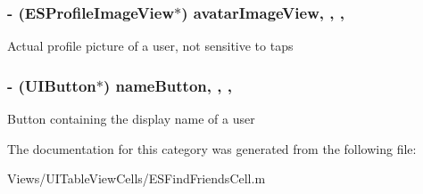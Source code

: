 \subsubsection[{avatar\+Image\+View}]{\setlength{\rightskip}{0pt plus 5cm}-\/ ({\bf E\+S\+Profile\+Image\+View}$\ast$) avatar\+Image\+View\hspace{0.3cm}{\ttfamily [read]}, {\ttfamily [write]}, {\ttfamily [nonatomic]}, {\ttfamily [strong]}}\label{category_e_s_find_friends_cell_07_08_abc768c8e3be189641cb1e8148bb9d060}
Actual profile picture of a user, not sensitive to taps \hypertarget{category_e_s_find_friends_cell_07_08_a620523864206c5b5b2925b7e2409723e}{}
\subsubsection[{name\+Button}]{\setlength{\rightskip}{0pt plus 5cm}-\/ (U\+I\+Button$\ast$) name\+Button\hspace{0.3cm}{\ttfamily [read]}, {\ttfamily [write]}, {\ttfamily [nonatomic]}, {\ttfamily [strong]}}\label{category_e_s_find_friends_cell_07_08_a620523864206c5b5b2925b7e2409723e}
Button containing the display name of a user 

The documentation for this category was generated from the following file\+:\begin{DoxyCompactItemize}
\item 
Views/\+U\+I\+Table\+View\+Cells/E\+S\+Find\+Friends\+Cell.\+m\end{DoxyCompactItemize}
